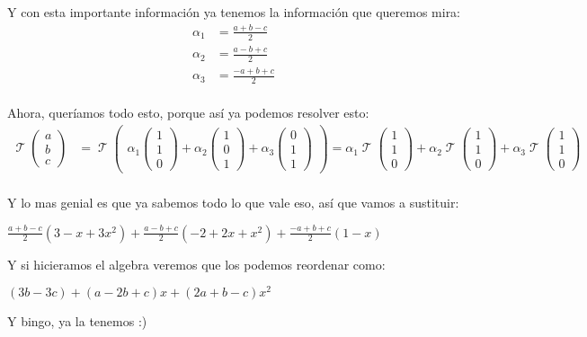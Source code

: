\documentclass[12pt]{report}                                    %
\DeclareMathOperator \LT {\mathcal{T}}                          %
\newcommand{\pVector}[1]{                                       %
        \ensuremath{\begin{pmatrix}#1\end{pmatrix}}                 %
    }
\begin{document}
            Y con esta importante información ya tenemos la información que queremos mira:
            \begin{equation*}
            \begin{split}
                \alpha_1 &= \frac{a+b-c}{2} \\
                \alpha_2 &= \frac{a-b+c}{2} \\
                \alpha_3 &= \frac{-a+b+c}{2} \\
            \end{split}
            \end{equation*}


            Ahora, queríamos todo esto, porque así ya podemos resolver esto:
            \begin{equation*}
            \begin{split}
                \LT \pVector{a\\b\\c} &= 
                \LT\pVector{
                    \alpha_1\pVector{1\\1\\0}+
                    \alpha_2\pVector{1\\0\\1}+
                    \alpha_3\pVector{0\\1\\1}
                }                                                   =
                \alpha_1 \LT\pVector{1\\1\\0} + 
                \alpha_2 \LT\pVector{1\\1\\0} + 
                \alpha_3 \LT\pVector{1\\1\\0}                       \\
            \end{split}
            \end{equation*}

            Y lo mas genial es que ya sabemos todo lo que vale eso, así que vamos a sustituir:

            $\frac{a+b-c}{2} (3-x+3x^2) + \frac{a-b+c}{2}(-2+2x+x^2) + \frac{-a+b+c}{2}(1-x)$

            Y si hicieramos el algebra veremos que los podemos reordenar como:

            $(3b-3c)+(a-2b+c)x+(2a+b-c)x^2$


            Y bingo, ya la tenemos :)
\end{document}
